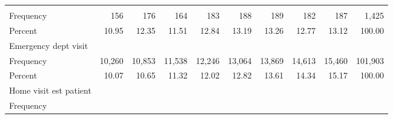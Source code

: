 \documentclass{article}
\begin{document}
\begin{table}[!h]
\begin{tabular}{llllllllll}
  \multicolumn{1}{|r}{} &
  \multicolumn{1}{r}{} &
  \multicolumn{1}{r}{} &
  \multicolumn{1}{r}{} &
  \multicolumn{1}{r}{} &
  \multicolumn{1}{r}{} &
  \multicolumn{1}{r}{} &
  \multicolumn{1}{r}{} &
  \multicolumn{1}{r}{} \\
\multicolumn{1}{l}{\hspace{2em}Frequency} &
  \multicolumn{1}{|r}{156} &
  \multicolumn{1}{r}{176} &
  \multicolumn{1}{r}{164} &
  \multicolumn{1}{r}{183} &
  \multicolumn{1}{r}{188} &
  \multicolumn{1}{r}{189} &
  \multicolumn{1}{r}{182} &
  \multicolumn{1}{r}{187} &
  \multicolumn{1}{r}{1,425} \\
\multicolumn{1}{l}{\hspace{2em}Percent} &
  \multicolumn{1}{|r}{10.95} &
  \multicolumn{1}{r}{12.35} &
  \multicolumn{1}{r}{11.51} &
  \multicolumn{1}{r}{12.84} &
  \multicolumn{1}{r}{13.19} &
  \multicolumn{1}{r}{13.26} &
  \multicolumn{1}{r}{12.77} &
  \multicolumn{1}{r}{13.12} &
  \multicolumn{1}{r}{100.00} \\
\multicolumn{1}{l}{\hspace{1em}Emergency dept visit} &
  \multicolumn{1}{|r}{} &
  \multicolumn{1}{r}{} &
  \multicolumn{1}{r}{} &
  \multicolumn{1}{r}{} &
  \multicolumn{1}{r}{} &
  \multicolumn{1}{r}{} &
  \multicolumn{1}{r}{} &
  \multicolumn{1}{r}{} &
  \multicolumn{1}{r}{} \\
\multicolumn{1}{l}{\hspace{2em}Frequency} &
  \multicolumn{1}{|r}{10,260} &
  \multicolumn{1}{r}{10,853} &
  \multicolumn{1}{r}{11,538} &
  \multicolumn{1}{r}{12,246} &
  \multicolumn{1}{r}{13,064} &
  \multicolumn{1}{r}{13,869} &
  \multicolumn{1}{r}{14,613} &
  \multicolumn{1}{r}{15,460} &
  \multicolumn{1}{r}{101,903} \\
\multicolumn{1}{l}{\hspace{2em}Percent} &
  \multicolumn{1}{|r}{10.07} &
  \multicolumn{1}{r}{10.65} &
  \multicolumn{1}{r}{11.32} &
  \multicolumn{1}{r}{12.02} &
  \multicolumn{1}{r}{12.82} &
  \multicolumn{1}{r}{13.61} &
  \multicolumn{1}{r}{14.34} &
  \multicolumn{1}{r}{15.17} &
  \multicolumn{1}{r}{100.00} \\
\multicolumn{1}{l}{\hspace{1em}Home visit est patient} &
  \multicolumn{1}{|r}{} &
  \multicolumn{1}{r}{} &
  \multicolumn{1}{r}{} &
  \multicolumn{1}{r}{} &
  \multicolumn{1}{r}{} &
  \multicolumn{1}{r}{} &
  \multicolumn{1}{r}{} &
  \multicolumn{1}{r}{} &
  \multicolumn{1}{r}{} \\
\multicolumn{1}{l}{\hspace{2em}Frequency} &

\end{tabular}
\end{table}
\end{document}
